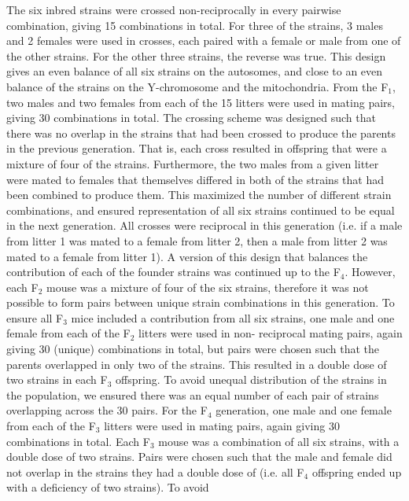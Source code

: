 \begin{refsection}
The six inbred strains were crossed non-reciprocally in every pairwise
combination, giving 15 combinations in total. For three of the strains, 3
males and 2 females were used in crosses, each paired with a female or male
from one of the other strains. For the other three strains, the reverse was
true. This design gives an even balance of all six strains on the autosomes,
and close to an even balance of the strains on the Y-chromosome and the
mitochondria. From the F$_{\text{1}}$, two males and two females from each of
the 15 litters were used in mating pairs, giving 30 combinations in total. The
crossing scheme was designed such that there was no overlap in the strains
that had been crossed to produce the parents in the previous generation. That
is, each cross resulted in offspring that were a mixture of four of the
strains.  Furthermore, the two males from a given litter were mated to females
that themselves differed in both of the strains that had been combined to
produce them.  This maximized the number of different strain combinations, and
ensured representation of all six strains continued to be equal in the next
generation.  All crosses were reciprocal in this generation (i.e. if a male
from litter 1 was mated to a female from litter 2, then a male from litter 2
was mated to a female from litter 1).  A version of this design that balances
the contribution of each of the founder strains was continued up to the
F$_{\text{4}}$. However, each F$_{\text{2}}$ mouse was a mixture of four of
the six strains, therefore it was not possible to form pairs between unique
strain combinations in this generation.   To ensure all F$_{\text{3}}$ mice
included a contribution from all six strains, one male and one female from
each of the F$_{\text{2}}$ litters were used in non- reciprocal mating pairs,
again giving 30 (unique) combinations in total, but pairs were chosen such
that the parents overlapped in only two of the strains. This resulted in a
double dose of two strains in each F$_{\text{3}}$ offspring. To avoid unequal
distribution of the strains in the population, we ensured there was an equal
number of each pair of strains overlapping across the 30 pairs.  For the
F$_{\text{4}}$ generation, one male and one female from each of the
F$_{\text{3}}$ litters were used in mating pairs, again giving 30 combinations
in total. Each F$_{\text{3}}$ mouse was a combination of all six strains, with
a double dose of two strains. Pairs were chosen such that the male and female
did not overlap in the strains they had a double dose of (i.e. all
F$_{\text{4}}$ offspring ended up with a deficiency of two strains).  To avoid

\end{refsection}
